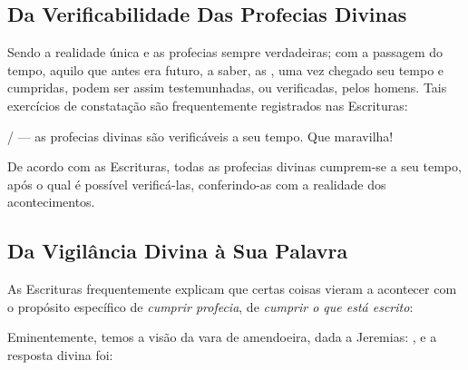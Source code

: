     \subsection{Da Verificabilidade Das Profecias Divinas}

    Sendo a realidade única e as profecias sempre verdadeiras; com a passagem do tempo, aquilo que antes era futuro, a saber, as
    ,  uma  vez  chegado  seu  tempo  e  cumpridas,  podem  ser  assim
    testemunhadas, ou verificadas, pelos homens. Tais exercícios de constatação são frequentemente registrados nas Escrituras:

 
     /  --- as profecias divinas são  verificáveis  a  seu  tempo.  Que
    maravilha!

    \begin{DEF}
        \label{def.pri.verificabilidade}
        De acordo com as Escrituras, todas as profecias divinas cumprem-se a seu  tempo,  após  o  qual  é  possível
        verificá-las, conferindo-as com a realidade dos acontecimentos.
    \end{DEF}


    \subsection{Da Vigilância Divina à Sua Palavra}

    As Escrituras frequentemente explicam que certas coisas vieram a acontecer  com  o  propósito  específico  de  \emph{cumprir
    profecia}, de \emph{cumprir o que está escrito}:


    Eminentemente, temos a visão da vara de amendoeira, dada a Jeremias: , e a resposta divina foi:

